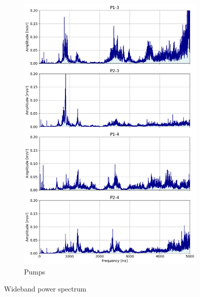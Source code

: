 \documentclass{llncs}
\begin{document}
\begin{figure}
\begin{subfigure}[b]{0.3\textwidth}
         \includegraphics[width=\textwidth]{fig/spectrum/pump-wideband.png}
         \caption{Pumps}
         \label{fig:motor-wideband}
     \end{subfigure}
     \caption{Wideband power spectrum}
\end{figure}
\end{document}

